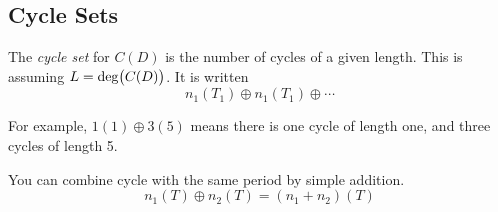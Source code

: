 \subsection{Cycle Sets}\label{subsec:Cycle_Sets}
\begin{definition}\label{def:Cycle_Set}
  The \emph{cycle set} for $C(D)$ is the number of cycles of a given length.
  This is assuming $L = \operatorname{\operatorname{deg}} \bigl( C(D) \bigr)$.
  It is written
  \begin{equation}\label{eq:Cycle_Set}
    n_{1} \left( T_{1} \right) \oplus n_{1} \left( T_{1} \right) \oplus \cdots
  \end{equation}

  For example, $1(1) \oplus 3(5)$ means there is one cycle of length one, and three cycles of length 5.

  \begin{remark}[Combining]
    You can combine cycle with the same period by simple addition.
    \begin{equation}\label{eq:Cycle_Set_Addition}
      n_{1}(T) \oplus n_{2}(T) =  \left( n_{1} + n_{2} \right) (T)
    \end{equation}
  \end{remark}
\end{definition}


